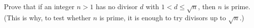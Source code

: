 Prove that if an integer $n>1$ has no divisor $d$ with $1<d\le\sqrt n$, then $n$ is prime. (This is why, to test whether $n$ is prime, it is enough to try divisors up to $\sqrt n$.)
